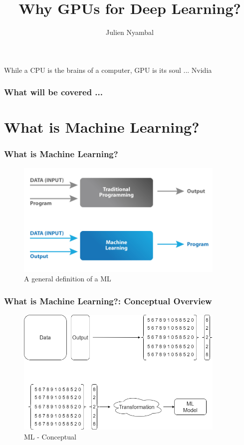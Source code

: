 \documentclass[11pt]{beamer}
\begin{document}
	\author{Julien Nyambal}
	\title{Why GPUs for Deep Learning?}
	\begin{frame}[plain]
		\maketitle
	\end{frame}

\begin{frame}
	\centering
	While a CPU is the brains of a computer, GPU is its soul ... Nvidia
\end{frame}

	\begin{frame}
		\frametitle{What will be covered ...}
		\tableofcontents
	\end{frame}

\section{What is Machine Learning?}
\begin{frame}
	\frametitle{What is Machine Learning?}
	\begin{figure}
		\includegraphics[width=100mm,scale=0.7]{ml}
		\caption{A general definition of a ML}
	\end{figure}
\end{frame}

\begin{frame}
	\frametitle{What is Machine Learning?: Conceptual Overview}
	\begin{figure}
	\includegraphics[width=100mm,scale=0.7]{ml_concept}
	\caption{ML - Conceptual}
\end{figure}
\end{frame}
\end{document}
